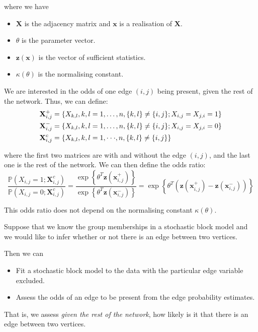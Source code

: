 \documentclass{article}
\begin{document}
where we have 
\begin{itemize}
    \item $\mathbf{X}$ is the adjacency matrix and $\mathbf{x}$ is a realisation of $\mathbf{X}$.
    \item $\theta$ is the parameter vector.
    \item $\mathbf{z}(\mathbf{x})$ is the vector of sufficient statistics.
    \item $\kappa(\theta)$ is the normalising constant.
\end{itemize}
We are interested in the odds of one edge $(i,j)$ being present, given the rest of the network. Thus, we can define:
\begin{align*}
    {\bf X}_{i,j}^{+}&=\{X_{k,l},k,l=1,\dots,n,\{k,l\}\neq\{i,j\};X_{i,j}=X_{j,i}=1\}\\
    {\bf X}_{i,j}^{-}&=\{X_{k,l},k,l=1,\dots,n,\{k,l\}\ne\{i,j\};X_{i,j}=X_{j,i}=0\}\\
    \mathbf{X}_{i,j}^{c}&=\{X_{k,l},k,l=1,\cdot\cdot\cdot,n,\{k,l\}\neq\{i,j\}\}
\end{align*}

where the first two matrices are with and without the edge $(i,j)$, and the last one is the rest of the network. We can then define the odds ratio:  
\begin{equation*}
    \frac{\mathbb{P}(X_{i,j}=1;\mathbf{X}_{i,j}^{c})}{\mathbb{P}(X_{i,j}=0;\mathbf{X}_{i,j}^{c})}=\frac{\exp\left\{\theta^{T}\mathbf{z}(\mathbf{x}_{i,j}^{+})\right\}}{\exp\left\{\theta^{T}\mathbf{z}(\mathbf{x}_{i,j}^{-})\right\}}=\exp\left\{\theta^{T}\left(\mathbf{z}(\mathbf{x}_{i,j}^{+})-\mathbf{z}(\mathbf{x}_{i,j}^{-})\right)\right\}
\end{equation*}

This odds ratio does not depend on the normalising constant $\kappa(\theta)$.

\begin{example}
Suppose that we know the group memberships in a stochastic block model and we would like to infer whether or not there is an edge between two vertices.  

Then we can
\begin{itemize}
    \item Fit a stochastic block model to the data with the particular edge variable excluded.
    \item Assess the odds of an edge to be present from the edge probability estimates.
\end{itemize}

That is, we assess \textit{given the rest of the network}, how likely is it that there is an edge between two vertices.  
\end{example}
\end{document}
